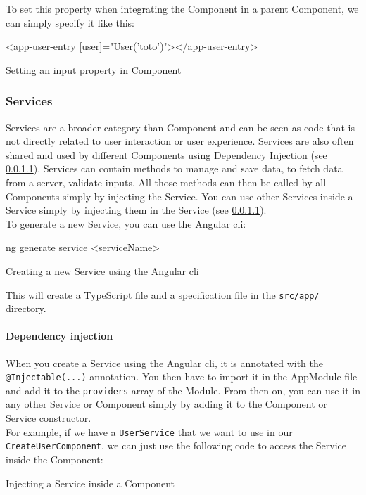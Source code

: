 \documentclass[twoside, openright,11pt,a4paper]{book}
\newenvironment{code}{\captionsetup{type=listing}}{}
\begin{document}
To set this property when integrating the Component in a parent Component, we can simply specify it like this:
\begin{code}
	\begin{inlinehtml}
<app-user-entry [user]="User('toto')"></app-user-entry>
	\end{inlinehtml}
	\caption{Setting an input property in Component}
\end{code}
\subsubsection{Services}
Services\cite{angular:doc:services} are a broader category than Component and can be seen as code that is not directly related to user interaction or user experience. Services are also often shared and used by different Components using Dependency Injection\cite{angular:doc:dependency_injection} (see \ref{dependency_injection}). Services can contain methods to manage and save data, to fetch data from a server, validate inputs. All those methods can then be called by all Components simply by injecting the Service. You can use other Services inside a Service simply by injecting them in the Service (see \ref{dependency_injection}).\\

To generate a new Service, you can use the Angular \gls{cli}:
\begin{code}
\begin{shell}
ng generate service <serviceName>
\end{shell}
	\caption{Creating a new Service using the Angular \gls{cli}}
\end{code}
This will create a TypeScript file and a specification file in the \verb+src/app/+ directory. 
\paragraph{Dependency injection}
\label{dependency_injection}
When you create a Service using the Angular \gls{cli}, it is annotated with the \verb+@Injectable(...)+ annotation. You then have to import it in the AppModule file and add it to the \verb+providers+ array of the Module. From then on, you can use it in any other Service or Component simply by adding it to the Component or Service constructor. \\

For example, if we have a \verb+UserService+ that we want to use in our \verb+CreateUserComponent+, we can just use the following code to access the Service inside the Component:
\begin{code}
	\caption{Injecting a Service inside a Component}
\end{code}
\end{document}
